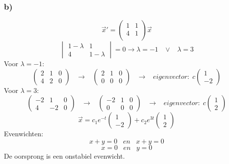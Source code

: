 \documentclass[11pt]{article}
\begin{document}
\subsubsection*{b)}
\[
\vec{x}' =
\begin{pmatrix}
1 & 1\\
4 & 1\\
\end{pmatrix} 
\vec{x}
\]
\[
\begin{vmatrix}
1-\lambda & 1\\
4 & 1-\lambda
\end{vmatrix}
= 0
\longrightarrow
\lambda = -1 \;\;\;\vee\;\;\; \lambda =3
\]
Voor $\lambda = -1$: 
\[
\left(
\begin{array}{cc|c}
2 & 1 & 0 \\
4 & 2 & 0
\end{array}
\right)
\;\;\;\longrightarrow\;\;\;
\left(
\begin{array}{cc|c}
2 & 1 & 0 \\
0 & 0 & 0
\end{array}
\right)
\;\;\;\longrightarrow\;\;\;
eigenvector:\;
c
\begin{pmatrix}
1\\-2
\end{pmatrix}
\]
Voor $\lambda = 3$: 
\[
\left(
\begin{array}{cc|c}
-2 & 1 & 0 \\
4 & -2 & 0
\end{array}
\right)
\;\;\;\longrightarrow\;\;\;
\left(
\begin{array}{cc|c}
-2 & 1 & 0 \\
0 & 0 & 0
\end{array}
\right)
\;\;\;\longrightarrow\;\;\;
eigenvector:\;
c
\begin{pmatrix}
1\\2
\end{pmatrix}
\]
\[
\vec{x} = c_1e^{-t}\begin{pmatrix}
1\\-2
\end{pmatrix}+c_2e^{3t}\begin{pmatrix}
1\\2
\end{pmatrix}
\]
Evenwichten:\\
\[
x+y=0 \;\;\;en\;\;\; x+y=0
\]
\[
x=0 \;\;\;en\;\;\; y=0
\]
De oorsprong is een onstabiel evenwicht.
\end{document}
